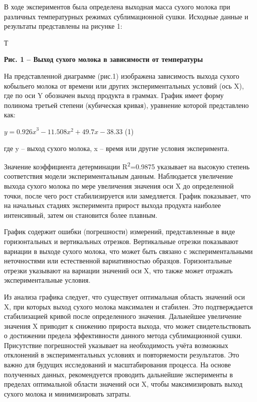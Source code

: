 В ходе экспериментов была определена выходная масса сухого молока при
различных температурных режимах сублимационной сушки. Исходные данные и
результаты представлены на рисунке 1:

Т

{\bfseries Рис. 1 -- Выход сухого молока в зависимости от температуры}

На представленной диаграмме (рис.1) изображена зависимость выхода сухого
кобыльего молока от времени или других экспериментальных условий (ось
X), где по оси Y обозначен выход продукта в граммах. График имеет форму
полинома третьей степени (кубическая кривая), уравнение которой
представлено как:

\(y = {0.926x}^{3} - 11.508x^{2} + 49.7x - 38.33\) (1)

где y -- выход сухого молока, x -- время или другие условия
эксперимента.

Значение коэффициента детерминации R\textsuperscript{2}=0.9875 указывает
на высокую степень соответствия модели экспериментальным данным.
Наблюдается увеличение выхода сухого молока по мере увеличения значения
оси X до определенной точки, после чего рост стабилизируется или
замедляется. График показывает, что на начальных стадиях эксперимента
прирост выхода продукта наиболее интенсивный, затем он становится более
плавным.

График содержит ошибки (погрешности) измерений, представленные в виде
горизонтальных и вертикальных отрезков. Вертикальные отрезки показывают
вариации в выходе сухого молока, что может быть связано с
экспериментальными неточностями или естественной вариативностью
образцов. Горизонтальные отрезки указывают на вариации значений оси X,
что также может отражать экспериментальные условия.

Из анализа графика следует, что существует оптимальная область значений
оси X, при которых выход сухого молока максимален и стабилен. Это
подтверждается стабилизацией кривой после определенного значения.
Дальнейшее увеличение значения X приводит к снижению прироста выхода,
что может свидетельствовать о достижении предела эффективности данного
метода сублимационной сушки. Присутствие погрешностей указывает на
необходимость учёта возможных отклонений в экспериментальных условиях и
повторяемости результатов. Это важно для будущих исследований и
масштабирования процесса. На основе полученных данных, рекомендуется
проводить дальнейшие эксперименты в пределах оптимальной области
значений оси X, чтобы максимизировать выход сухого молока и
минимизировать затраты.

